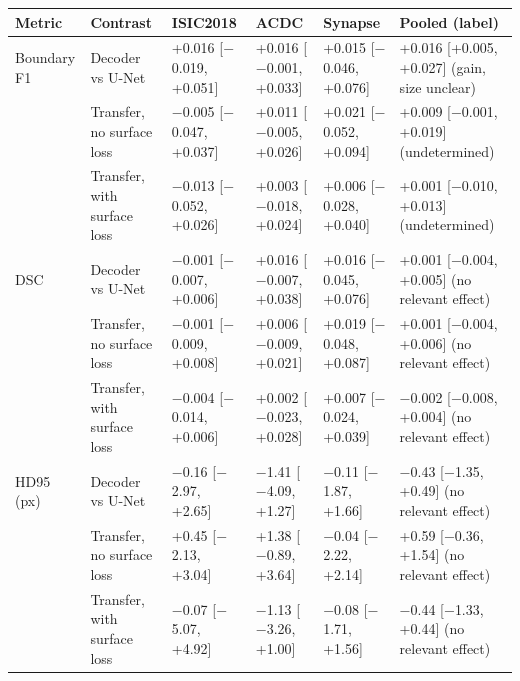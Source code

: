 \begin{tabular}{llllll}
\toprule
Metric & Contrast & ISIC2018 & ACDC & Synapse & Pooled (label) \\
\midrule
Boundary F1 & Decoder vs U-Net & +0.016 [$-$0.019, +0.051] & +0.016 [$-$0.001, +0.033] & +0.015 [$-$0.046, +0.076] & +0.016 [+0.005, +0.027] (gain, size unclear) \\
 & Transfer, no surface loss & $-$0.005 [$-$0.047, +0.037] & +0.011 [$-$0.005, +0.026] & +0.021 [$-$0.052, +0.094] & +0.009 [$-$0.001, +0.019] (undetermined) \\
 & Transfer, with surface loss & $-$0.013 [$-$0.052, +0.026] & +0.003 [$-$0.018, +0.024] & +0.006 [$-$0.028, +0.040] & +0.001 [$-$0.010, +0.013] (undetermined) \\
\midrule
DSC & Decoder vs U-Net & $-$0.001 [$-$0.007, +0.006] & +0.016 [$-$0.007, +0.038] & +0.016 [$-$0.045, +0.076] & +0.001 [$-$0.004, +0.005] (no relevant effect) \\
 & Transfer, no surface loss & $-$0.001 [$-$0.009, +0.008] & +0.006 [$-$0.009, +0.021] & +0.019 [$-$0.048, +0.087] & +0.001 [$-$0.004, +0.006] (no relevant effect) \\
 & Transfer, with surface loss & $-$0.004 [$-$0.014, +0.006] & +0.002 [$-$0.023, +0.028] & +0.007 [$-$0.024, +0.039] & $-$0.002 [$-$0.008, +0.004] (no relevant effect) \\
\midrule
HD95 (px) & Decoder vs U-Net & $-$0.16 [$-$2.97, +2.65] & $-$1.41 [$-$4.09, +1.27] & $-$0.11 [$-$1.87, +1.66] & $-$0.43 [$-$1.35, +0.49] (no relevant effect) \\
 & Transfer, no surface loss & +0.45 [$-$2.13, +3.04] & +1.38 [$-$0.89, +3.64] & $-$0.04 [$-$2.22, +2.14] & +0.59 [$-$0.36, +1.54] (no relevant effect) \\
 & Transfer, with surface loss & $-$0.07 [$-$5.07, +4.92] & $-$1.13 [$-$3.26, +1.00] & $-$0.08 [$-$1.71, +1.56] & $-$0.44 [$-$1.33, +0.44] (no relevant effect) \\
\bottomrule
\end{tabular}
